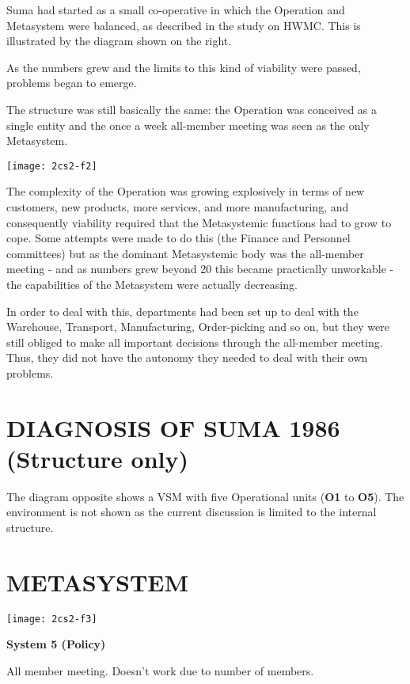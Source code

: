 Suma had started as a small co-operative in which the Operation and Metasystem were balanced, as described in the study on HWMC. This is illustrated by the diagram shown on the right.

As the numbers grew and the limits to this kind of viability were passed, problems began to emerge.

The structure was still basically the same: the Operation was conceived as a single entity and the once a week all-member meeting was seen as the only Metasystem.

\begin{center}
\texttt{[image: 2cs2-f2]}
\end{center}

The complexity of the Operation was growing explosively in terms of new customers, new products, more services, and more manufacturing, and consequently viability required that the Metasystemic functions had to grow to cope. Some attempts were made to do this (the Finance and Personnel committees) but as the dominant Metasystemic body was the all-member meeting - and as numbers grew beyond 20 this became practically unworkable - the capabilities of the Metasystem were actually decreasing.

In order to deal with this, departments had been set up to deal with the Warehouse, Transport, Manufacturing, Order-picking and so on, but they were still obliged to make all important decisions through the all-member meeting. Thus, they did not have the autonomy they needed to deal with their own problems.

\section*{DIAGNOSIS OF SUMA 1986 (Structure only)}
The diagram opposite shows a VSM with five Operational units (\textbf{O1} to \textbf{O5}). The environment is not shown as the current discussion is limited to the internal structure.

\section*{METASYSTEM}
\begin{center}
\texttt{[image: 2cs2-f3]}
\end{center}

\textbf{System 5 (Policy)}

All member meeting. Doesn't work due to number of members.

